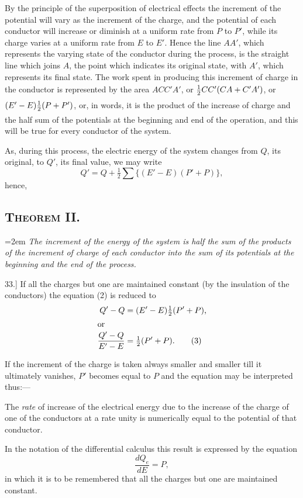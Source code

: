 \documentclass[12pt,oneside]{book}[2021/10/04]
\newcommand{\Heading}{\centering\normalfont}
\newcommand{\Section}[1]{\subsection*{\normalsize\Heading\scshape #1}}
\newcommand{\article}[1]{\phantomsection \label{art:#1}{#1.]}}
\newcommand{\hangpara}[1]{\hangindent=2em {\itshape #1} \vspace{1ex}}
\newcommand{\tstrut}{\rule[-1.5ex]{0pt}{4.2ex}}
\newcommand{\¬}{\hphantom{0}}
\begin{document}
By the principle of the superposition of electrical effects the increment
of the potential will vary as the increment of the charge,
and the potential of each conductor
will increase or diminish
at a uniform rate from \(P\) to \(P'\),
while its charge varies at a uniform
rate from \(E\) to \(E'\). Hence
the line \(AA'\), which represents
the varying state of the conductor
during the process, is the
straight line which joins \(A\), the
point which indicates its original
state, with \(A'\), which represents
its final state. The work spent
in producing this increment of
charge in the conductor is represented by the area \(ACC'A'\), or
\(\tstrut\frac{1}{2}CC'(CA + C'A')\), or \((E' - E)\tstrut\frac{1}{2}(P + P')\), or, in words, it is the product
of the increase of charge and the half sum of the potentials
at the beginning and end of the operation, and this will be true for
every conductor of the system.

As, during this process, the electric energy of the system changes
from \(Q\), its original, to \(Q'\), its final value, we may write
\[Q' = Q + \tfrac{1}{2}\sum\{(E' - E)(P' + P)\}, \tag{2}\]
hence,
\Section{Theorem II.}

\hangpara{
The increment of the energy of the system is half the sum of the
products of the increment of charge of each conductor into the
sum of its potentials at the beginning and the end of the process.
}

\article{33} If all the charges but one are maintained constant (by the
insulation of the conductors) the equation (2) is reduced to
\begin{align*}
Q' - Q &= (E' - E)\tfrac{1}{2}(P' + P)\text{,}\\
\shortintertext{or}
\frac{Q' - Q}{E' - E} &= \tfrac{1}{2}(P' + P)\text{.} \tag{3}
\end{align*}

If the increment of the charge is taken always smaller and smaller
till it ultimately vanishes, \(P'\) becomes equal to \(P\) and the equation
may be interpreted thus:---

The \textit{rate} of increase of the electrical energy due to the increase
of the charge of one of the conductors at a rate unity is numerically
equal to the potential of that conductor.

In the notation of the differential calculus this result is expressed
by the equation
\[\frac{dQ_e}{dE} = P, \tag{4}\]
in which it is to be remembered that all the charges but one are
maintained constant.
\end{document}
